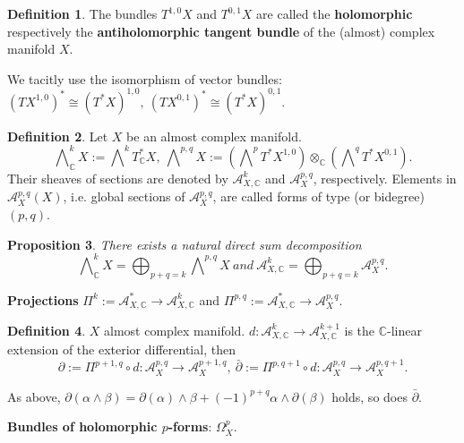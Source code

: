 \documentclass{article}
\theoremstyle{definition}
\newtheorem{definition}{Definition}[subsection]
\theoremstyle{plain}
\newtheorem{proposition}[definition]{Proposition}
\begin{document}
\begin{definition}
    The bundles $ T^{1,0}X $ and $ T^{0,1}X $ are called the \textbf{holomorphic} respectively the \textbf{antiholomorphic tangent bundle} of the (almost) complex manifold $ X $.
\end{definition}

We tacitly use the isomorphism of vector bundles: $ (TX^{1,0})^*\cong(T^*X)^{1,0},\ (TX^{0,1})^*\cong(T^*X)^{0,1} $.

\begin{definition}
    Let $ X $ be an almost complex manifold.\[
        \bigwedge\nolimits^{k}_{\mathbb{C}}X:=\bigwedge\nolimits^{k} T_{\mathbb{C}}^* X,\ \bigwedge\nolimits^{p,q}X:=(\bigwedge\nolimits^p T^* X^{1,0})\otimes_{\mathbb{C}}(\bigwedge\nolimits^q T^* X^{0,1}).
    \]Their sheaves of sections are denoted by $ \mathcal{A}^{k}_{X,\mathbb{C}} $ and $ \mathcal{A}^{p,q}_{X} $, respectively. Elements in $ \mathcal{A}^{p,q}_{X}(X) $, i.e. global sections of $ \mathcal{A}^{p,q}_{X} $, are called forms of type (or bidegree) $ (p,q) $.
\end{definition}

\begin{proposition}\label{decom}
    There exists a natural direct sum decomposition\[
        \bigwedge\nolimits^k_{\mathbb{C}}X=\bigoplus_{p+q=k}\bigwedge\nolimits^{p,q}X\ and\ \mathcal{A}^k_{X,\mathbb{C}}=\bigoplus_{p+q=k}\mathcal{A}_{X}^{p,q}.
    \]
\end{proposition}

\textbf{Projections} $ \varPi^{k}:=\mathcal{A}^*_{X,\mathbb{C}}\rightarrow\mathcal{A}^{k}_{X,\mathbb{C}} $ and $ \varPi^{p,q}:=\mathcal{A}^*_{X,\mathbb{C}}\rightarrow\mathcal{A}^{p,q}_{X} $.

\begin{definition}
    $ X $ almost complex manifold. $ d:\mathcal{A}^{k}_{X,\mathbb{C}}\rightarrow\mathcal{A}^{k+1}_{X,\mathbb{C}} $ is the $ \mathbb{C} $-linear extension of the exterior differential, then\[
        \partial:=\varPi^{p+1,q}\circ d:\mathcal{A}^{p,q}_{X}\longrightarrow\mathcal{A}^{p+1,q}_{X},\ \bar{\partial}:=\varPi^{p,q+1}\circ d:\mathcal{A}^{p,q}_{X}\longrightarrow\mathcal{A}^{p,q+1}_{X}.
    \]
\end{definition}

As above, $ \partial(\alpha\wedge\beta)=\partial(\alpha)\wedge\beta+(-1)^{p+q}\alpha\wedge\partial(\beta) $ holds, so does $ \bar{\partial} $.

\textbf{Bundles of holomorphic $ p $-forms}: $ \varOmega^p_X $.
\end{document}
